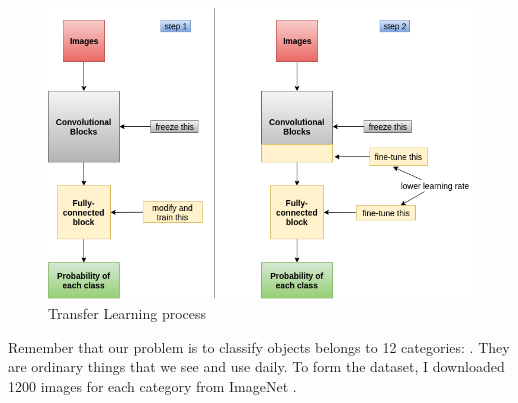 \begin{figure}[tb]
	\centering
	\includegraphics[width=0.9\hsize]{./figures/transferLearning}
	\caption{Transfer Learning process}
	\label{fig:transferLearning}
\end{figure}

Remember that our problem is to classify objects belongs to 12 categories: . They are ordinary things that we see and use daily. To form the dataset, I downloaded 1200 images for each category from ImageNet \cite{imagenet_cvpr09}.

